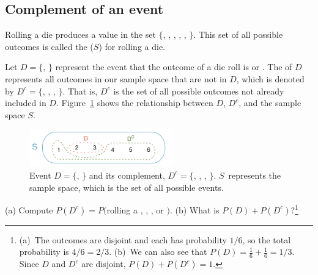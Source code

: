 \begin{doublespace}
\subsection{Complement of an event}

Rolling a die produces a value in the set $\{$, , , , , $\}$. This set of all possible outcomes is called the  ($S$) for rolling a die. 

Let $D=\{$, $\}$ represent the event that the outcome of a die roll is  or . The  of $D$ represents all outcomes in our sample space that are not in $D$, which is denoted by $D^c = \{$, , , $\}$. That is, $D^c$ is the set of all possible outcomes not already included in $D$. Figure~\ref{fig:complementOfD} shows the relationship between $D$, $D^c$, and the sample space $S$. 

\begin{figure}[hht]
\centering
\includegraphics[width=0.55\textwidth]{ch_probability_oi_biostat/figures/complementOfD/complementOfD}
\caption{Event $D=\{$, $\}$ and its complement, $D^c = \{$, , , $\}$. $S$~represents the sample space, which is the set of all possible events.}
\label{fig:complementOfD}
\end{figure}

\begin{exercise}
(a) Compute $P(D^c) = P($rolling a , , , or $)$. (b) What is $P(D) + P(D^c)$?\footnote{(a)~The outcomes are disjoint and each has probability $1/6$, so the total probability is $4/6=2/3$. (b)~We can also see that $P(D)=\frac{1}{6} + \frac{1}{6} = 1/3$. Since $D$ and $D^c$ are disjoint, $P(D) + P(D^c) = 1$.}
\end{exercise}


\end{doublespace}
